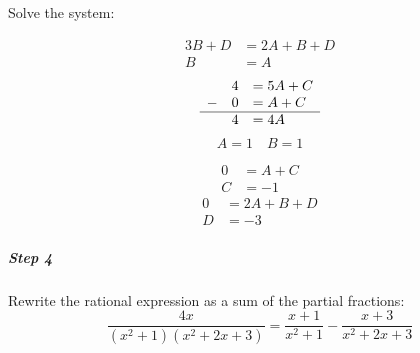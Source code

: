 						Solve the system:
						\\
						\begin{minipage}[t]{0.2\textwidth}
							\begin{align*}
								3B + D &= 2A + B + D \\
								B &= A
							\end{align*}
							\begin{equation*}
								\begin{array}{lll}
									  &4 &= 5A + C \\
									- &0 &=  A + C \\\hline
									  &4 &= 4A \\
								\end{array}
							\end{equation*}
							\[A=1 \quad B=1\]
						\end{minipage}
						\begin{minipage}[t]{0.8\textwidth}
							\begin{align*}
								0 &= A+C \\
								C &= -1 \tag{Substitute in $A=1$}
							\end{align*}
							\begin{align*}
								0 &= 2A + B + D \\
								D &= -3 \tag{Substitute in $A=1$ and $B=1$}
							\end{align*}
						\end{minipage}
					\subparagraph{Step 4}
						Rewrite the rational expression as a sum of the partial fractions:
						\[\frac{4x}{(x^2+1)(x^2+2x+3)} = \frac{x+1}{x^2+1} - \frac{x+3}{x^2+2x+3}\]
